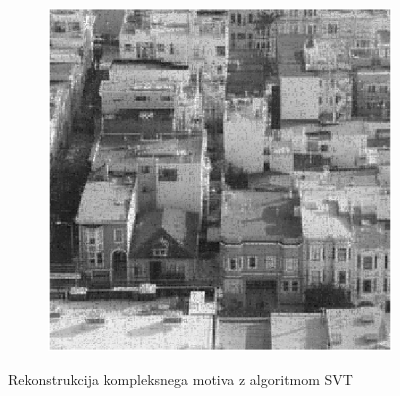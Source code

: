 \begin{figure}
\begin{subfigure}{0.325\linewidth}
    \end{subfigure}
    \hfill
    \begin{subfigure}{0.325\linewidth}
        \includegraphics[width=\linewidth]{Poglavja/Slike/kompleksna grayscale 300/rez60SVT.png}
    \end{subfigure}
    \caption{Rekonstrukcija kompleksnega motiva z algoritmom SVT}
\end{figure}

